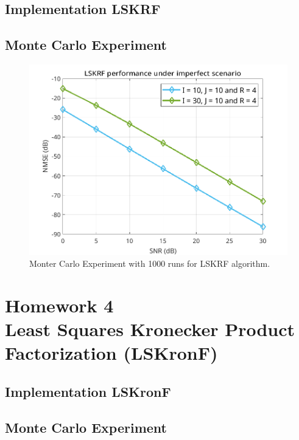 \documentclass[a4paper,10pt]{article}
\begin{document}
    \subsection*{Implementation LSKRF}

    \subsection*{Monte Carlo Experiment}

    \begin{figure}[ht!]
        \centering 
        \includegraphics[width=0.75\linewidth]{figs/hw3.png} \par 
        \caption{Monter Carlo Experiment with 1000 runs for LSKRF algorithm.}
        \label{fig:hw3} 
    \end{figure}

\newpage
\section*{Homework 4 \\ Least Squares Kronecker Product Factorization (LSKronF)}

    \subsection*{Implementation LSKronF}

    \subsection*{Monte Carlo Experiment}
\end{document}
